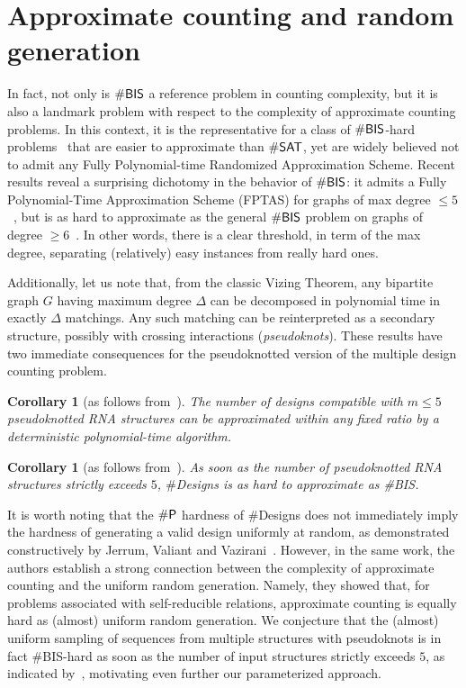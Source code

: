 \documentclass[10pt]{article}
\newtheorem{corollary}[theorem]{Corollary}
\newcommand{\Def}[1]{\emph{#1}}
\newcommand{\NumDesign}{\ensuremath{\#}{\sf Designs}\xspace}
\newcommand{\citep}[1]{\cite{#1}}
\newcommand{\citet}[1]{\cite{#1}}
\begin{document}
\section{Approximate counting and random generation}
In fact, not only is $\#{\sf BIS}$ a reference problem in counting complexity, but it is also a landmark problem with respect to the complexity of approximate counting problems. In this context, it is the representative for a class of $\#{\sf BIS}$-hard problems~\citep{Bulatov2013} that are easier to approximate than $\# {\sf SAT}$, yet are widely believed not to admit any Fully Polynomial-time Randomized Approximation Scheme. Recent results reveal a surprising dichotomy in the behavior of $\#{\sf BIS}$: it admits a Fully Polynomial-Time Approximation Scheme (FPTAS) for graphs of max degree $\le 5$~\citep{Weitz2006}, but is as hard to approximate as the general $\#{\sf BIS}$ problem on graphs of degree $\ge 6$~\citep{Cai2016}. In other words, there is a clear threshold, in term of the max degree, separating (relatively) easy instances from really hard ones.

Additionally, let us note that, from the classic Vizing Theorem, any bipartite graph $G$ having maximum degree $\Delta$ can be decomposed in polynomial time in exactly $\Delta$ matchings. Any such matching can be reinterpreted as a secondary structure, possibly with crossing interactions (\Def{pseudoknots}). These results have two immediate consequences for the pseudoknotted version of the multiple design counting problem.
\begin{corollary}[as follows from~\citep{Weitz2006}]The number of designs compatible with $m\le 5$ pseudoknotted RNA structures can be approximated within any fixed ratio by a deterministic polynomial-time algorithm.
\end{corollary}
\begin{corollary}[as follows from~\citep{Cai2016}]
  As soon as the number of pseudoknotted RNA structures strictly exceeds $5$, \NumDesign is as hard to approximate as {\#{\sf BIS}}.
\end{corollary}

It is worth noting that the $\#{\sf P}$ hardness of \NumDesign does not immediately imply the hardness of generating a valid design uniformly at random, as demonstrated constructively by Jerrum, Valiant and Vazirani~\citep{Jerrum1986}. However, in the same work, the authors establish a strong connection between the complexity of approximate counting and the uniform random generation. Namely, they showed that, for problems associated with self-reducible relations, approximate counting is equally hard as (almost) uniform random generation. We conjecture that the (almost) uniform sampling of sequences from multiple structures with pseudoknots is in fact \#{\sf BIS}-hard as soon as the number of input structures strictly exceeds $5$, as indicated by~\citet{Goldberg2004}, motivating even further our parameterized approach.
\end{document}
